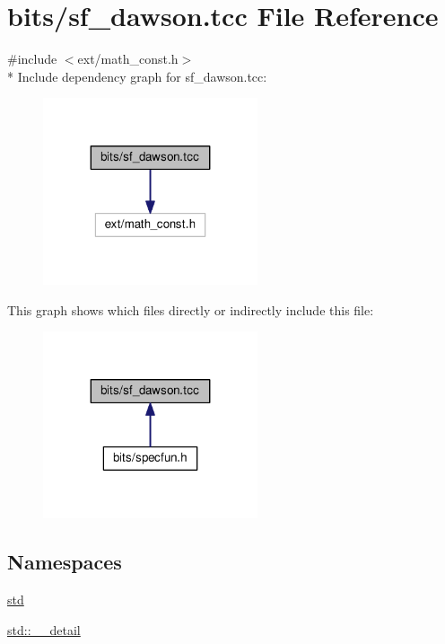 \hypertarget{sf__dawson_8tcc}{}\section{bits/sf\+\_\+dawson.tcc File Reference}
\label{sf__dawson_8tcc}
{\ttfamily \#include $<$ext/math\+\_\+const.\+h$>$}\\*
Include dependency graph for sf\+\_\+dawson.\+tcc\+:
\nopagebreak
\begin{figure}[H]
\begin{center}
\leavevmode
\includegraphics[width=179pt]{sf__dawson_8tcc__incl}
\end{center}
\end{figure}
This graph shows which files directly or indirectly include this file\+:
\nopagebreak
\begin{figure}[H]
\begin{center}
\leavevmode
\includegraphics[width=179pt]{sf__dawson_8tcc__dep__incl}
\end{center}
\end{figure}
\subsection*{Namespaces}
\begin{DoxyCompactItemize}
\item 
 \hyperlink{namespacestd}{std}
\item 
 \hyperlink{namespacestd_1_1____detail}{std\+::\+\_\+\+\_\+detail}
\end{DoxyCompactItemize}
